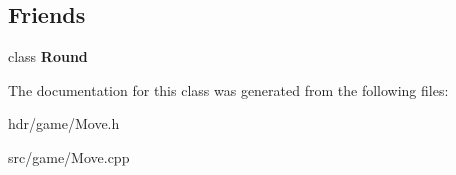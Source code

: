 \subsection*{Friends}
\begin{DoxyCompactItemize}
\item 
class {\bfseries Round}\label{class_move_aae72f8e1249fbf187032c257b544873d}

\end{DoxyCompactItemize}


The documentation for this class was generated from the following files\-:\begin{DoxyCompactItemize}
\item 
hdr/game/Move.\-h\item 
src/game/Move.\-cpp\end{DoxyCompactItemize}
